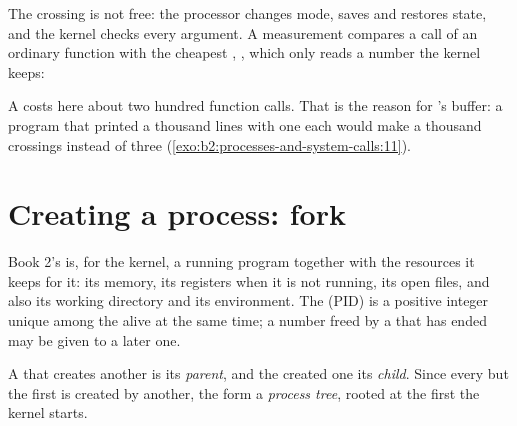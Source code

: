 The crossing is not free: the processor changes mode, saves and restores state, and the kernel checks every
argument. A measurement compares a call of an ordinary function with the cheapest , , which
only reads a number the kernel keeps:


\label{out:b2:processes-and-system-calls:cost}

A  costs here about two hundred function calls. That is the reason for 's buffer: a program
that printed a thousand lines with one  each would make a thousand crossings instead of three
(\cref{exo:b2:processes-and-system-calls:11}).

\section{Creating a process: fork}\label{sec:b2:processes-and-system-calls:fork}

\begin{remark}\label{def:b2:processes-and-system-calls:process}
Book 2's  is, for the kernel, a running program together with the resources it keeps for it: its memory, its
registers when it is not running, its open files, and also its working directory and its environment. The  (PID) is a positive integer unique among the  alive at the same time; a number freed by a 
that has ended may be given to a later one.
\end{remark}

\begin{definition}\label{def:b2:processes-and-system-calls:tree}
A  that creates another is its \emph{parent}, and the created one its
\emph{child}. Since every  but the first is created by another, the  form a
\emph{process tree}, rooted at the first  the kernel starts.
\end{definition}

